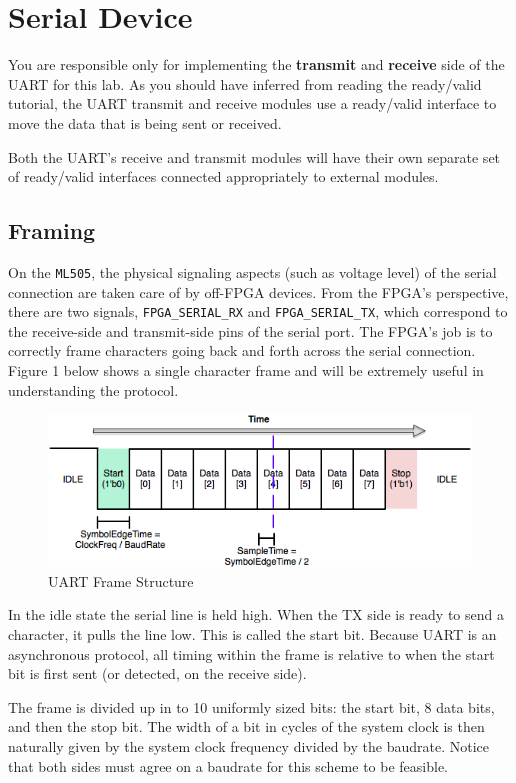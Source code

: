 \documentclass[11pt]{article}
\begin{document}
\section{Serial Device}
You are responsible only for implementing the \textbf{transmit} and \textbf{receive} side of the UART for this lab. As you should have inferred from reading the ready/valid tutorial, the UART transmit and receive modules use a ready/valid interface to move the data that is being sent or received.

Both the UART’s receive and transmit modules will have their own separate set of ready/valid interfaces connected appropriately to external modules.

\subsection{Framing}
On the \verb|ML505|, the physical signaling aspects (such as voltage level) of the serial connection are taken care of by off-FPGA devices. From the FPGA's perspective, there are two signals, \verb|FPGA_SERIAL_RX| and \verb|FPGA_SERIAL_TX|, which correspond to the receive-side and transmit-side pins of the serial port.  The FPGA's job is to correctly frame characters going back and forth across the serial connection. Figure 1 below shows a single character frame and will be extremely useful in understanding the protocol.
\begin{figure}[H]
\centering
\includegraphics[width=6in]{images/uart_frame.png}
\caption{UART Frame Structure}
\end{figure}
In the idle state the serial line is held high. When the TX side is ready to send a character, it pulls the line low. This is called the start bit. Because UART is an asynchronous protocol, all timing within the frame is relative to when the start bit is first sent (or detected, on the receive side). 

The frame is divided up in to 10 uniformly sized bits: the start bit, 8 data bits, and then the stop bit. The width of a bit in cycles of the system clock is then naturally given by the system clock frequency divided by the baudrate. Notice that both sides must agree on a baudrate for this scheme to be feasible.
\end{document}
